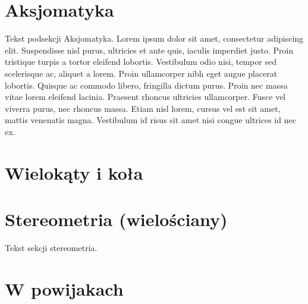 \documentclass{greaseproof}
\newcommand{\loremipsum}{ {\color{gray}  Lorem ipsum dolor sit amet, consectetur adipiscing elit. Suspendisse nisl purus, ultricies et ante quis, iaculis imperdiet justo. Proin tristique turpis a tortor eleifend lobortis. Vestibulum odio nisi, tempor sed scelerisque ac, aliquet a lorem. Proin ullamcorper nibh eget augue placerat lobortis. Quisque ac commodo libero, fringilla dictum purus. Proin nec massa vitae lorem eleifend lacinia. Praesent rhoncus ultricies ullamcorper. Fusce vel viverra purus, nec rhoncus massa. Etiam nisl lorem, cursus vel est sit amet, mattis venenatis magna. Vestibulum id risus sit amet nisi congue ultrices id nec ex. } }
\begin{document}


\section{Aksjomatyka}
Tekst podsekcji Aksjomatyka. \loremipsum





\section{Wielokąty i koła}









\section{Stereometria (wielościany)}
Tekst sekcji stereometria.

\section{W powijakach}


{}


\raggedright
{}
\printindex

\printindex[persons]
\end{document}
